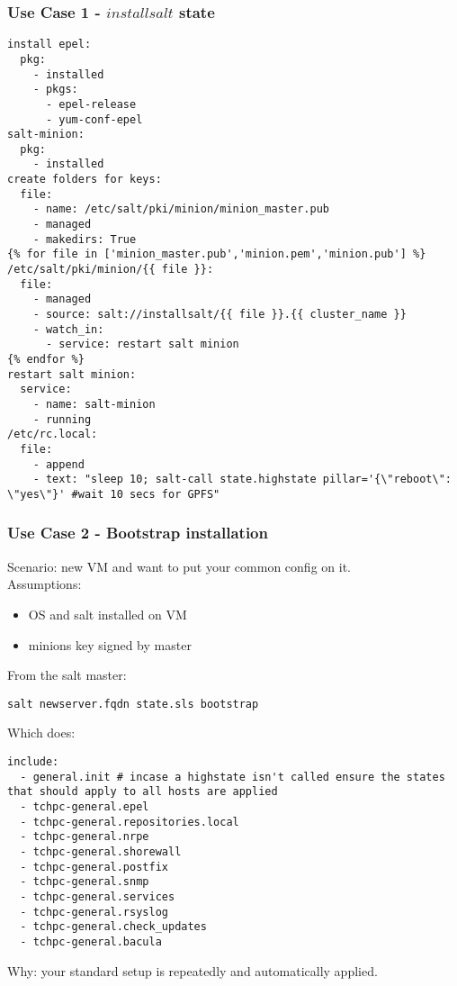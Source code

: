 \documentclass{beamer}
\begin{document}
\begin{frame}[fragile]
\frametitle{Use Case 1 - $installsalt$ state}
\begin{lstlisting}[basicstyle=\tiny,]
install epel:
  pkg:
    - installed
    - pkgs:
      - epel-release
      - yum-conf-epel
salt-minion:
  pkg:
    - installed
create folders for keys:
  file:
    - name: /etc/salt/pki/minion/minion_master.pub
    - managed
    - makedirs: True
{% for file in ['minion_master.pub','minion.pem','minion.pub'] %}
/etc/salt/pki/minion/{{ file }}:
  file:
    - managed
    - source: salt://installsalt/{{ file }}.{{ cluster_name }}
    - watch_in:
      - service: restart salt minion
{% endfor %}
restart salt minion:
  service:
    - name: salt-minion
    - running
/etc/rc.local:
  file:
    - append
    - text: "sleep 10; salt-call state.highstate pillar='{\"reboot\": \"yes\"}' #wait 10 secs for GPFS"
\end{lstlisting}
\end{frame}

\begin{frame}[fragile]
\frametitle{Use Case 2 - Bootstrap installation}
Scenario: new VM and want to put your common config on it.\\
Assumptions:\\
\begin{itemize}
\item OS and salt installed on VM
\item minions key signed by master
\end{itemize}
From the salt master:\\
\begin{lstlisting}[basicstyle=\tiny,]
salt newserver.fqdn state.sls bootstrap
\end{lstlisting}
Which does:\\
\begin{lstlisting}[basicstyle=\tiny,]
include:
  - general.init # incase a highstate isn't called ensure the states that should apply to all hosts are applied
  - tchpc-general.epel
  - tchpc-general.repositories.local
  - tchpc-general.nrpe
  - tchpc-general.shorewall
  - tchpc-general.postfix
  - tchpc-general.snmp
  - tchpc-general.services
  - tchpc-general.rsyslog
  - tchpc-general.check_updates
  - tchpc-general.bacula
\end{lstlisting}
Why: your standard setup is repeatedly and automatically applied.
\end{frame}
\end{document}
